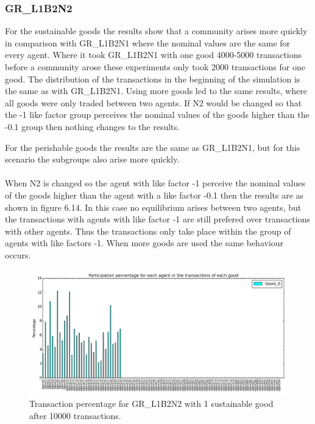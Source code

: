 \documentclass[twoside,openright]{uva-bachelor-thesis}
\begin{document}
\clearpage
\subsubsection{GR\_L1B2N2}
For the sustainable goods the results show that a community arises more quickly in comparison with GR\_L1B2N1 where the nominal values are the same for every agent. Where it took GR\_L1B2N1 with one good 4000-5000 transactions before a community arose these experiments only took 2000 transactions for one good. The distribution of the transactions in the beginning of the simulation is the same as with GR\_L1B2N1. Using more goods led to the same results, where all goods were only traded between two agents. If N2 would be changed so that the -1 like factor group perceives the nominal values of the goods higher than the -0.1 group then nothing changes to the results.

For the perishable goods the results are the same as GR\_L1B2N1, but for this scenario the subgroups also arise more quickly.
\\
\\
When N2 is changed so the agent with like factor -1 perceive the nominal values of the goods higher than the agent with a like factor -0.1 then the results are as shown in figure 6.14. In this case no equilibrium arises between two agents, but the transactions with agents with like factor -1 are still prefered over transactions with other agents. Thus the transactions only take place within the group of agents with like factors -1. When more goods are used the same behaviour occurs. \\
\begin{figure}[h!]
  \centering
  \includegraphics[scale=0.4]{Simulation2_figures/GR_L1B2N2_321/Figure1_10k} 
  \caption{Transaction percentage for GR\_L1B2N2 with 1 sustainable good after 10000 transactions.}
\end{figure}
\end{document}
